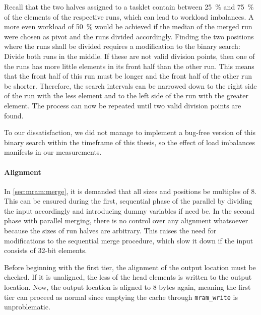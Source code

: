 Recall that the two halves assigned to a tasklet contain between \qty{25}{\percent} and \qty{75}{\percent} of the elements of the respective runs, which can lead to workload imbalances.
A more even workload of \qty{50}{\percent} would be achieved if the median of the merged run were chosen as pivot and the runs divided accordingly.
Finding the two positions where the runs shall be divided requires a modification to the binary search:
Divide both runs in the middle.
If these are not valid division points, then one of the runs has more little elements in its front half than the other run.
This means that the front half of this run must be longer and the front half of the other run be shorter.
Therefore, the search intervals can be narrowed down to the right side of the run with the less element and to the left side of the run with the greater element.
The process can now be repeated until two valid division points are found.

To our dissatisfaction, we did not manage to implement a bug-free version of this binary search within the timeframe of this thesis, so the effect of load imbalances manifests in our measurements.


\paragraph{Alignment}
In \cref{sec:mram:merge}, it is demanded that all sizes and positions be multiples of 8.
This can be ensured during the first, sequential phase of the parallel \MS{} by dividing the input accordingly and introducing dummy variables if need be.
In the second phase with parallel merging, there is no control over any alignment whatsoever because the sizes of run halves are arbitrary.
This raises the need for modifications to the sequential merge procedure, which slow it down if the input consists of 32-bit elements.

Before beginning with the first tier, the alignment of the output location must be checked.
If it is unaligned, the less of the head elements is written to the output location.
Now, the output location is aligned to 8 bytes again, meaning the first tier can proceed as normal since emptying the cache through \lstinline|mram_write| is unproblematic.

